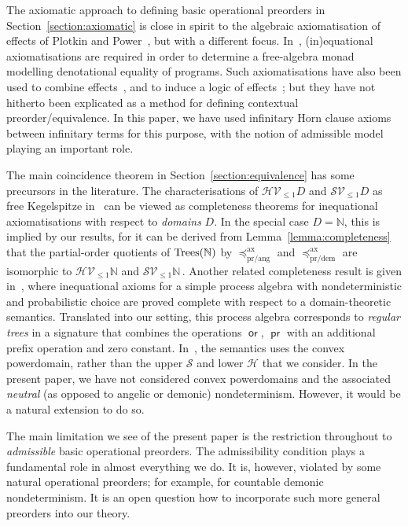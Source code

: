 \documentclass[a4paper,UKenglish]{lipics-v2018}
\newcommand{\Tree}{\textnormal{Trees}} %
\newcommand{\Basicleq}{\preccurlyeq}
\newcommand{\prEff}{\operatorname{\textsf{pr}}}
\newcommand{\orEff}{\operatorname{\textsf{or}}}
\newcommand{\prang}{\text{pr/ang}}
\newcommand{\prdem}{\text{pr/dem}}
\newcommand{\Ax}{\text{ax}}
\theoremstyle{plain}
\begin{document}
The axiomatic approach to defining basic operational preorders in Section~\ref{section:axiomatic} is close in spirit to the algebraic axiomatisation of effects of Plotkin and Power~\cite{PlotkinPower2002}, but with a different focus. 
In~\cite{PlotkinPower2002}, (in)equational axiomatisations are required in order to determine a
free-algebra monad modelling denotational equality of programs. Such axiomatisations have also been used to combine effects~\cite{hyland2006combining},
 and to induce a logic of effects~\cite{PlotkinPretnarLogic}; but they have not 
 hitherto been explicated as a method for defining  contextual preorder/equivalence. 
 In this paper, we have used  infinitary Horn clause axioms between infinitary terms for this purpose, with the notion of admissible model playing an important role.
 
 The main coincidence theorem in Section~\ref{section:equivalence} has some precursors in the literature. 
 The characterisations of  $\mathcal{H}\mathcal{V}_{\leq 1} D$
 and  $\mathcal{S}\mathcal{V}_{\leq 1} D$ as free Kegelspitze in~\cite{KeimelP2016} can be viewed as completeness theorems for inequational axiomatisations with respect to
 \emph{domains} $D$. In the special case $D = \mathbb{N}$, this is implied by our results, for it can be derived from Lemma~\ref{lemma:completeness} that the partial-order quotients of 
 $\Tree(\mathbb{N})$ by $\Basicleq^\Ax_\prang$ and $\Basicleq^\Ax_\prdem$ are isomorphic to
  $\mathcal{H}\mathcal{V}_{\leq 1} \mathbb{N}$
 and  $\mathcal{S}\mathcal{V}_{\leq 1} \mathbb{N}\,$.  Another related completeness result is given in~\cite{mislove2004axioms},  where inequational axioms for 
 a simple process algebra with nondeterministic and probabilistic choice are proved
 complete with respect to a domain-theoretic semantics. Translated into our setting, this process algebra corresponds to  \emph{regular trees} in a signature that combines
 the operations $\orEff$, $\prEff$ with an additional prefix operation and zero constant.
In~\cite{mislove2004axioms}, the semantics uses the convex powerdomain, rather than the upper $\mathcal{S}$ and lower $\mathcal{H}$ that we consider. In  the present paper, we have 
not considered  convex powerdomains and the associated \emph{neutral} (as opposed to angelic or demonic) nondeterminism. However, it would be a natural extension to do so.

The main limitation we see of the present paper is the restriction throughout to \emph{admissible} basic operational preorders. The admissibility condition plays a fundamental role in almost everything we do. It is, however, violated by some natural operational preorders; for example,  for countable demonic nondeterminism. 
It is an open question how to incorporate such more general preorders into our theory.











\end{document}
